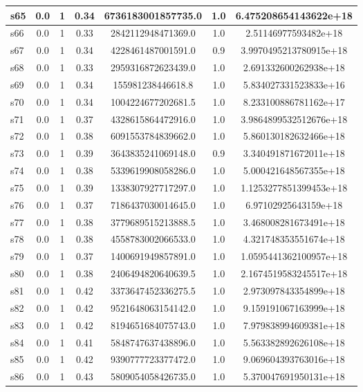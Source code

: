 \documentclass{article}
\begin{document}
\begin{tabular}{|l|c|c|c|c|c|c|}
\hline
s65 &0.0 & 1 & 0.34 & 6736183001857735.0 & 1.0 & 6.475208654143622e+18\\
\hline
s66 &0.0 & 1 & 0.33 & 2842112948471369.0 & 1.0 & 2.51146977593482e+18\\
\hline
s67 &0.0 & 1 & 0.34 & 4228461487001591.0 & 0.9 & 3.9970495213780915e+18\\
\hline
s68 &0.0 & 1 & 0.33 & 2959316872623439.0 & 1.0 & 2.691332600262938e+18\\
\hline
s69 &0.0 & 1 & 0.34 & 155981238446618.8 & 1.0 & 5.834027331523833e+16\\
\hline
s70 &0.0 & 1 & 0.34 & 1004224677202681.5 & 1.0 & 8.233100886781162e+17\\
\hline
s71 &0.0 & 1 & 0.37 & 4328615864472916.0 & 1.0 & 3.9864899532512676e+18\\
\hline
s72 &0.0 & 1 & 0.38 & 6091553784839662.0 & 1.0 & 5.860130182632466e+18\\
\hline
s73 &0.0 & 1 & 0.39 & 3643835241069148.0 & 0.9 & 3.340491871672011e+18\\
\hline
s74 &0.0 & 1 & 0.38 & 5339619908058286.0 & 1.0 & 5.000421648567355e+18\\
\hline
s75 &0.0 & 1 & 0.39 & 1338307927717297.0 & 1.0 & 1.1253277851399453e+18\\
\hline
s76 &0.0 & 1 & 0.37 & 7186437030014645.0 & 1.0 & 6.97102925643159e+18\\
\hline
s77 &0.0 & 1 & 0.38 & 3779689515213888.5 & 1.0 & 3.468008281673491e+18\\
\hline
s78 &0.0 & 1 & 0.38 & 4558783002066533.0 & 1.0 & 4.321748353551674e+18\\
\hline
s79 &0.0 & 1 & 0.37 & 1400691949857891.0 & 1.0 & 1.0595441362100957e+18\\
\hline
s80 &0.0 & 1 & 0.38 & 2406494820640639.5 & 1.0 & 2.1674519583245517e+18\\
\hline
s81 &0.0 & 1 & 0.42 & 3373647452336275.5 & 1.0 & 2.973097843354899e+18\\
\hline
s82 &0.0 & 1 & 0.42 & 9521648063154142.0 & 1.0 & 9.159191067163999e+18\\
\hline
s83 &0.0 & 1 & 0.42 & 8194651684075743.0 & 1.0 & 7.979838994609381e+18\\
\hline
s84 &0.0 & 1 & 0.41 & 5848747637438896.0 & 1.0 & 5.563382892626108e+18\\
\hline
s85 &0.0 & 1 & 0.42 & 9390777723377472.0 & 1.0 & 9.069604393763016e+18\\
\hline
s86 &0.0 & 1 & 0.43 & 5809054058426735.0 & 1.0 & 5.370047691950131e+18\\

\end{tabular}
\end{document}
